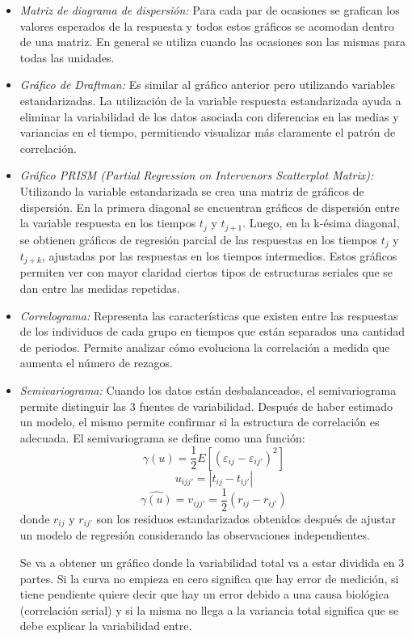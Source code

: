 \documentclass[spanish]{article}
\numberwithin{figure}{subsection}
\numberwithin{equation}{subsection}
\numberwithin{table}{subsection}
\begin{document}
\begin{itemize}
	\item \textit{Matriz de diagrama de dispersión:} Para cada par de ocasiones se grafican los valores esperados de la
	respuesta y todos estos gráficos se acomodan dentro de una matriz. En general se utiliza cuando las ocasiones son las
	mismas para todas las unidades.
	\item \textit{Gráfico de Draftman:} Es similar al gráfico anterior pero utilizando variables estandarizadas.
	La utilización de la variable respuesta estandarizada ayuda a eliminar la variabilidad de los datos asociada con
	diferencias en las medias y variancias en el tiempo, permitiendo visualizar más claramente el patrón de correlación.
	\item \textit{Gráfico PRISM (Partial Regression on Intervenors Scatterplot Matrix):} Utilizando la variable estandarizada
	se crea una matriz de gráficos de dispersión. En la primera diagonal se encuentran gráficos de dispersión entre la
	variable respuesta en los tiempos $t_j$ y $t_{j+1}$. Luego, en la k-ésima diagonal, se obtienen gráficos de regresión
	parcial de las respuestas en los tiempos $t_j$ y $t_{j+k}$, ajustadas por las respuestas en los tiempos intermedios.
	Estos gráficos permiten ver con mayor claridad ciertos tipos de estructuras seriales que se dan entre las
	medidas repetidas.
	\item \textit{Correlograma:} Representa las características que existen entre las respuestas de los individuos de
	cada grupo en tiempos que están separados una cantidad de periodos. Permite analizar cómo evoluciona la correlación
	a medida que aumenta el número de rezagos.
	\item \textit{Semivariograma:} Cuando los datos están desbalanceados, el semivariograma permite distinguir las 3 fuentes
	de variabilidad. Después de haber estimado un modelo, el mismo permite confirmar si la estructura de correlación es
	adecuada. El semivariograma se define como una función:
	\[ \gamma(u) = \frac{1}{2} E[(\varepsilon _{ij} - \varepsilon_{ij'})^2] \]
	\[ u_{ijj'} = |t_{ij} - t_{ij'}| \]
	\[ \widehat{\gamma(u)} = v_{ijj'} = \frac{1}{2} (r_{ij} - r_{ij'}) \]
	donde $r_{ij}$ y $r_{ij'}$ son los residuos estandarizados obtenidos después de ajustar un modelo de regresión
	considerando las observaciones independientes.

	Se va a obtener un gráfico donde la variabilidad total va a estar dividida en 3 partes. Si la curva no empieza en
	cero significa que hay error de medición, si tiene pendiente quiere decir que hay un error debido a una causa
	biológica (correlación serial) y si la misma no llega a la variancia total significa que se debe explicar la
	variabilidad entre.
\end{itemize}
\end{document}

